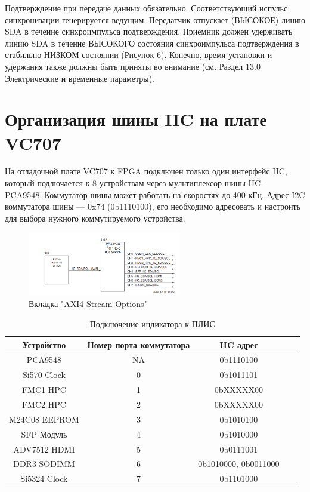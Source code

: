 \documentclass[a4paper,oneside ,14pt]{extreport}
\begin{document}
Подтверждение при передаче данных обязательно. Соответствующий испульс
синхронизации генерируется ведущим. Передатчик отпускает (ВЫСОКОЕ) линию SDA в
течение синхроимпульса подтверждения. Приёмник должен удерживать линию SDA в
течение ВЫСОКОГО состояния синхроимпульса подтверждения в стабильно НИЗКОМ
состоянии (Рисунок 6). Конечно, время установки и удержания также должны быть
приняты во внимание (см. Раздел 13.0 Электрические и временные параметры).

\section{Организация шины IIC на плате VC707}

На отладочной плате VC707 к FPGA подключен только один интерфейс IIC, 
который подлючается к 8 устройствам через мультиплексор шины IIC - PCA9548.
Коммутатор шины может работать на скоростях до 400 кГц. Адрес I2C коммутатора шины — 0x74 (0b1110100), 
его необходимо адресовать и настроить для выбора нужного коммутируемого устройства.

\begin{figure}[h]
	\centering
	\includegraphics[width=0.6\textwidth]{image/PCA9548.png}
	\caption{Вкладка "AXI4-Stream Options"}
	\label{PCA9548.PNG}
\end{figure}

\begin{table}[!ht]
	\begin{center}
		\begin{tabular}{c c c c c}
			\hline\hline
			Устройство & Номер порта коммутатора &  IIC адрес \\
			\hline
			PCA9548 		& NA &	0b1110100  \\
			Si570 Clock 	& 0 & 	0b1011101  \\
			FMC1 HPC 		& 1 & 	0bXXXXX00  \\
			FMC2 HPC 		& 2 & 	0bXXXXX00  \\
			M24C08 EEPROM 	& 3 & 	0b1010100   \\
			SFP Модуль 		& 4 & 	0b1010000   \\
			ADV7512 HDMI 	& 5 & 	0b0111001  \\
			DDR3 SODIMM 	& 6 & 	0b1010000, 0b0011000  \\
			Si5324 Clock 	& 7 & 	0b1101000  \\
			\hline
		\end{tabular}
		\caption{Подключение индикатора к ПЛИС}
		\label{LCD_TO_FPGA}
	\end{center}
\end{table}
\end{document}
